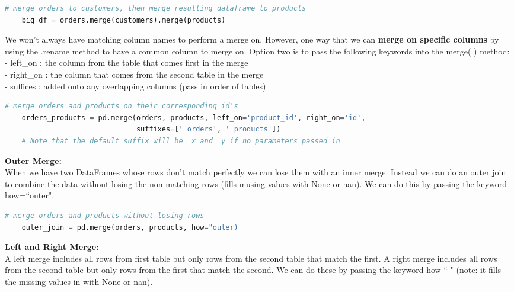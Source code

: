 \documentclass[11pt, a4paper]{article}
\begin{document}
\begin{spacing}{1.1}
\begin{lstlisting}[language=Python]
	# merge orders to customers, then merge resulting dataframe to products
	big_df = orders.merge(customers).merge(products) \end{lstlisting}\vspace*{1mm}
	We won't always have matching column names to perform a merge on. However, one way that we can \textbf{merge on specific columns} by using the .rename method to have a common column to merge on. Option two is to pass the following keywords into the merge( ) method: \\
	\hspace*{3mm} - left\_on : the column from the table that comes first in the merge \\
	\hspace*{3mm} - right\_on : the column that comes from the second table in the merge \\
	\hspace*{3mm} - suffices : added onto any overlapping columns (pass in order of tables)
	\begin{lstlisting}[language=Python]
	# merge orders and products on their corresponding id's
	orders_products = pd.merge(orders, products, left_on='product_id', right_on='id', 
	                           suffixes=['_orders', '_products']) 
	# Note that the default suffix will be _x and _y if no parameters passed in \end{lstlisting}\vspace*{1mm}
	\underline{\textbf{Outer Merge:}} \\
	When we have two DataFrames whose rows don't match perfectly we can lose them with an inner merge. Instead we can do an outer join to combine the data without losing the non-matching rows (fills musing values with None or nan). We can do this by passing the keyword how=``outer".
	\begin{lstlisting}[language=Python]
	# merge orders and products without losing rows
	outer_join = pd.merge(orders, products, how="outer) \end{lstlisting}\vspace*{1mm}
	\underline{\textbf{Left and Right Merge:}} \\
	A left merge includes all rows from first table but only rows from the second table that match the first. A right merge includes all rows from the second table but only rows from the first that match the second. We can do these by passing the keyword how `` " (note: it fills the missing values in with None or nan). 
	\begin{lstlisting}[language=Python]

\end{lstlisting}
\end{spacing}
\end{document}
